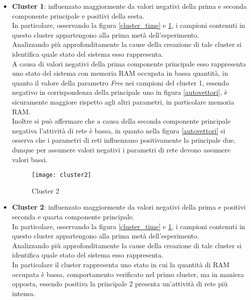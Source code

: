 \begin{itemize}

  \begin{figure}[!htbp]
    \centering
    \texttt{[image: cluster1]}
    \caption{Grafico 3D del Cluster 1}
    \label{cluster1}
  \end{figure}

  \item \textbf{Cluster 1}: influenzato maggiormente da valori negativi della
  prima e seconda componente principale e positivi della sesta.\\
  In particolare, osservando la figura \ref{cluster_time} e \ref{cluster1}, i campioni contenuti
  in questo cluster appartengono alla prima metà dell'esperimento.\\
  Analizzando più approfonditamente la cause della creazione di tale cluster si
  identifica quale stato del sistema esso rappresenta.\\
  A causa di valori negativi della prima componente principale esso
  rappresenta uno stato del sistema con memoria RAM occupata in bassa quantità,
  in quanto il valore della parametro \textit{Free} nei campioni del cluster 1,
  essendo negativo in corrispondenza della principale uno in figura \ref{autovettori},
  è sicuramente maggiore rispetto agli altri parametri, in particolare memoria RAM.\\
  Inoltre si può affermare che a causa della seconda componente principale negativa
  l'attività di rete è bassa, in quanto nella figura \ref{autovettori} si osserva
  che i parametri di reti influenzano positivamente la principale due, dunque
  per assumere valori negativi i parametri di rete devono assumere valori bassi.

  \clearpage

  \begin{figure}[!htbp]
    \centering
    \texttt{[image: cluster2]}
    \caption{Cluster 2}
    \label{cluster2}
  \end{figure}

  \item \textbf{Cluster 2}: influenzato maggiormente da valori negativi della
  prima e positivi seconda e quarta componente principale.\\
  In particolare, osservando la figura \ref{cluster_time} e \ref{cluster1}, i campioni contenuti
  in questo cluster appartengono alla prima metà dell'esperimento.\\
  Analizzando più approfonditamente la cause della creazione di tale cluster si
  identifica quale stato del sistema esso rappresenta.\\
  In particolare il cluster rappresenta uno stato in cui la quantità di RAM occupata
  è bassa, comportamento verificato nel primo cluster, ma in maniera opposta,
  essendo positiva la principale 2 presenta un'attività di rete più intensa.


\end{itemize}
